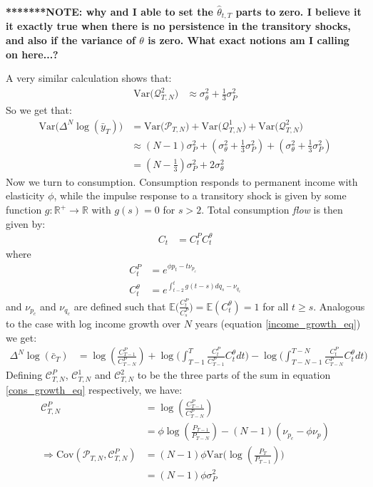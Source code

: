 \textbf{*******NOTE: why and I able to set the $\hat{\theta}_{t,T}$ parts to zero. I believe it it exactly true when there is no persistence in the transitory shocks, and also if the variance of $\theta$ is zero. What exact notions am I calling on here...?}

A very similar calculation shows that:
\begin{align*}
\mathrm{Var}\big(\mathcal{Q}^2_{T,N}\big) 
&\approx  \sigma^2_{\theta} +  \frac{1}{3}\sigma^2_P
\end{align*}
So we get that:
\begin{align*}
\mathrm{Var}\Big(\Delta^N\log(\bar{y}_T) \Big)&= \mathrm{Var}\big(\mathcal{P}_{T,N}\big) +\mathrm{Var}\big(\mathcal{Q}^1_{T,N}\big) +\mathrm{Var}\big(\mathcal{Q}^2_{T,N}\big) \\
&\approx (N-1)\sigma^2_P + (\sigma^2_{\theta} +  \frac{1}{3}\sigma^2_P)+(\sigma^2_{\theta} +  \frac{1}{3}\sigma^2_P) \\
&= (N-\frac{1}{3})\sigma^2_P +2\sigma^2_{\theta}
\end{align*}
Now we turn to consumption. Consumption responds to permanent income with elasticity $\phi$, while the impulse response to a transitory shock is given by some function $g:\mathbb{R}^+ \rightarrow \mathbb{R}$ with $g(s)=0$ for $s>2$. Total consumption \textit{flow} is then given by:
\begin{align*}
C_t&= C^{P}_t C^{\theta}_t 
\end{align*}
where
\begin{align*}
C^P_t &= e^{\phi p_t - t\nu_{p_c} }\\
C^{\theta}_t &=	e^{ \int_{t-2}^{t} g(t-s)dq_s -\nu_{q_c}}
\end{align*}
and $\nu_{p_c}$ and $\nu_{q_c}$ are defined such that $\mathbb{E}\Big(\frac{C^P_t}{C^P_s}\Big)=\mathbb{E}(C^{\theta}_t)=1$ for all $t \geq s$. Analogous to the case with log income growth over $N$ years (equation \ref{income_growth_eq}) we get:
\begin{align}
\Delta^N\log(\bar{c}_T) &=   \log(\frac{C^P_{T-1}}{C^P_{T-N}})  + \log \Bigg(  \int_{T-1}^{T} \frac{C^P_t}{C^P_{T-1}}C^{\theta}_t dt\Bigg)  - \log \Bigg(  \int_{T-N-1}^{T-N}  \frac{C^P_t}{C^P_{T-N}} C^{\theta}_t  dt\Bigg) \label{cons_growth_eq}
\end{align}
Defining $\mathcal{C}^P_{T,N}$, $\mathcal{C}^1_{T,N}$ and $\mathcal{C}^2_{T,N}$ to be the three parts of the sum in equation \ref{cons_growth_eq} respectively, we have:
\begin{align*}
\mathcal{C}^P_{T,N} &= \log(\frac{C^P_{T-1}}{C^P_{T-N}}) \\
& = \phi \log(\frac{P_{T-1}}{P_{T-N}}) -(N-1)(\nu_{p_c}-\phi \nu_p) \\
\Rightarrow \mathrm{Cov}(\mathcal{P}_{T,N},\mathcal{C}^P_{T,N}) &= (N-1)\phi \mathrm{Var}\Big(\log(\frac{P_{T}}{P_{T-1}})\Big) \\
&= (N-1)\phi\sigma^2_P
\end{align*}

